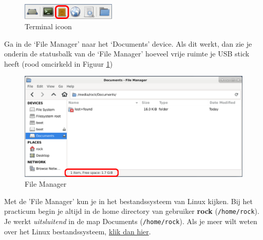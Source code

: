 \begin{figure}[h!]
	\centering
	\begin{center} 	
		\includegraphics[width=0.4\textwidth]{figuren/File-Manager}
		\caption{Terminal icoon}
		\label{fig:fileman}   
	\end{center}
\end{figure}
Ga in de ‘File Manager’ naar het ‘Documents’ device.\newline
Als dit werkt, dan zie je onderin de statusbalk van de ‘File Manager’ hoeveel vrije ruimte je USB stick heeft (rood omcirkeld in Figuur \ref{fig:fileman})

\begin{figure}[h!]
	\centering
	\begin{center} 	
		\includegraphics[width=1\textwidth]{figuren/FileManagerUsbStick}
		\caption{File Manager}
		\label{fig:FileManagerUsbStick}   
	\end{center}
\end{figure}

Met de 'File Manager' kun je in het bestandssysteem van Linux kijken.\newline
Bij het practicum begin je altijd in de home directory van gebruiker \textbf{rock} (\texttt{/home/rock}). Je werkt \textit{uitsluitend} in de map Documents (\texttt{/home/rock}).\newline
Als je meer wilt weten over het Linux bestandssysteem, \href{https://www.techrepublic.com/article/linux-101-demystifying-the-linux-directory-structure/}{klik dan hier}.
